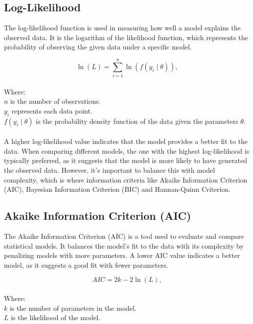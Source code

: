 \documentclass[doublespacing,12pt]{report}
\begin{document}
\subsection{Log-Likelihood}

The log-likelihood function is used in measuring how well a model explains the observed data. It is the logarithm of the likelihood function, which represents the probability of observing the given data under a specific model.

\begin{equation}
\ln(L) = \sum_{i=1}^{n} \ln(f(y_i \mid \theta)),
\end{equation}\\
Where:\\
\vspace{0.1in}
     \(n\) is the number of observations. \\
\vspace{0.1in}
   \(y_i\) represents each data point. \\
\vspace{0.1in}
   \(f(y_i \mid \theta)\) is the probability density function of the data given the parameters \(\theta\). \\
\vspace{0.1in} \\
A higher log-likelihood value indicates that the model provides a better fit to the data. When comparing different models, the one with the highest log-likelihood is typically preferred, as it suggests that the model is more likely to have generated the observed data. However, it's important to balance this with model complexity, which is where information criteria like  Akaike Information Criterion (AIC), Bayesian Information Criterion (BIC) and Hannan-Quinn Criterion.

\subsection{Akaike Information Criterion (AIC)}

The Akaike Information Criterion (AIC) is a tool used to evaluate and compare statistical models. It balances the model's fit to the data with its complexity by penalizing models with more parameters. A lower AIC value indicates a better model, as it suggests a good fit with fewer parameters.

\begin{equation}
AIC = 2k - 2\ln(L),
\end{equation}\\
Where:\\
\vspace{0.1in}
     \(k\) is the number of parameters in the model. \\
\vspace{0.1in}
     \(L\) is the likelihood of the model. \\
\end{document}
